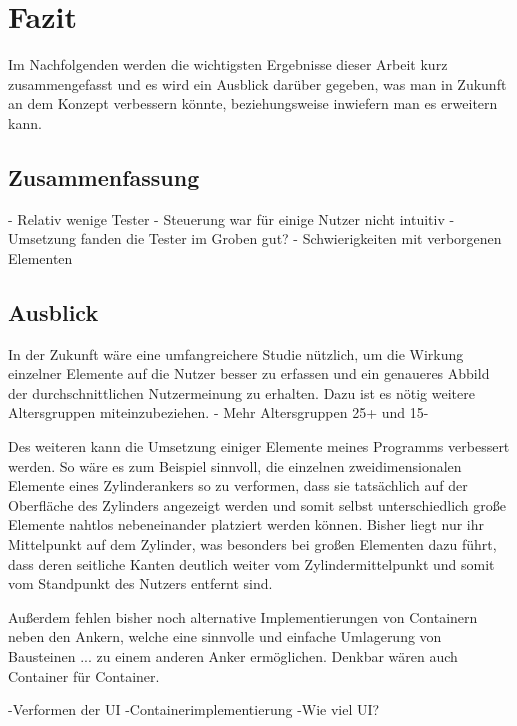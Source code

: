 
\chapter{Fazit}\label{chapter:conclusion}

	Im Nachfolgenden werden die wichtigsten Ergebnisse dieser Arbeit kurz zusammengefasst und es wird ein Ausblick darüber gegeben, was man in Zukunft an dem Konzept verbessern könnte, beziehungsweise inwiefern man es erweitern kann.

	\section{Zusammenfassung}
		- Relativ wenige Tester
		- Steuerung war für einige Nutzer nicht intuitiv
		- Umsetzung fanden die Tester im Groben gut?
		- Schwierigkeiten mit verborgenen Elementen
	
	\section{Ausblick}
		
		In der Zukunft wäre eine umfangreichere Studie nützlich, um die Wirkung einzelner Elemente auf die Nutzer besser zu erfassen und ein genaueres Abbild der durchschnittlichen Nutzermeinung zu erhalten. Dazu ist es nötig weitere Altersgruppen miteinzubeziehen. - Mehr Altersgruppen 25+ und 15-
		
		Des weiteren kann die Umsetzung einiger Elemente meines Programms verbessert werden. So wäre es zum Beispiel sinnvoll, die einzelnen zweidimensionalen Elemente  eines Zylinderankers so zu verformen, dass sie tatsächlich auf der Oberfläche des Zylinders angezeigt werden und somit selbst unterschiedlich große Elemente nahtlos nebeneinander platziert werden können. Bisher liegt nur ihr Mittelpunkt auf dem Zylinder, was besonders bei großen Elementen dazu führt, dass deren seitliche Kanten deutlich weiter vom Zylindermittelpunkt und somit vom Standpunkt des Nutzers entfernt sind.
		
		Außerdem fehlen bisher noch alternative Implementierungen von Containern neben den Ankern, welche eine sinnvolle und einfache Umlagerung von Bausteinen ... zu einem anderen Anker ermöglichen. Denkbar wären auch Container für Container.
				
		-Verformen der UI
		-Containerimplementierung
		-Wie viel UI?